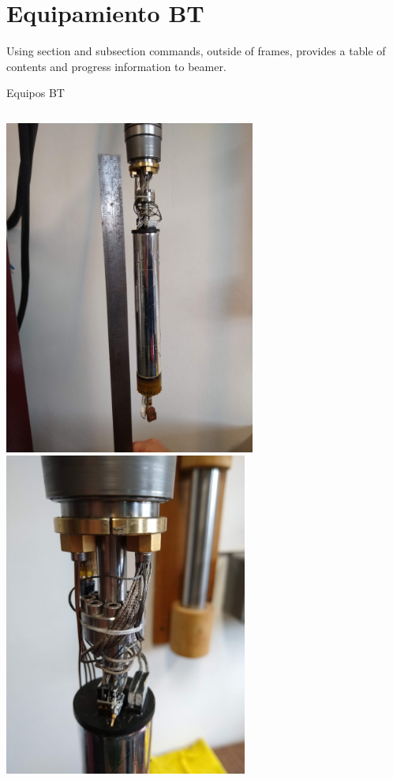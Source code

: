 \documentclass[ignorenonframetext,12pt]{beamer}
\begin{document}
\section{Equipamiento BT}
Using section and subsection commands, outside of frames, provides a table of contents and progress information to beamer.
\begin{frame}{Equipos BT}
				\begin{columns}
								\begin{column}{0.45\textwidth}
												\includegraphics[angle=-90,width=0.62\textwidth]{IMG_20190523_105037648} \\ 
												\includegraphics[angle=-90,width=0.6\textwidth]{IMG_20190523_105054061}

\end{column}
\end{columns}
\end{frame}
\end{document}
